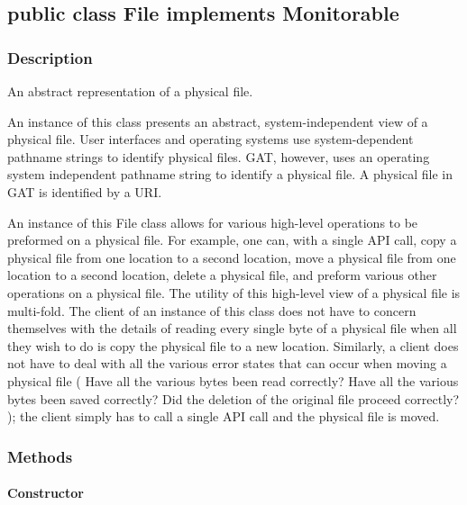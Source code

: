 \documentclass[$Date: 2003/06/26 19:29:31 $]{glabarticle}
\begin{document}
\subsection{public class File implements Monitorable}


\subsubsection{Description}

An abstract representation of a physical file.

An instance of this class presents an abstract, system-independent
view of a physical file. User interfaces and operating systems use
system-dependent pathname strings to identify physical files. GAT,
however, uses an operating system independent pathname string to
identify a physical file. A physical file in GAT is identified by a
URI.

An instance of this File class allows for various high-level
operations to be preformed on a physical file. For example, one can,
with a single API call, copy a physical file from one location to a
second location, move a physical file from one location to a second
location, delete a physical file, and preform various other operations
on a physical file. The utility of this high-level view of a physical
file is multi-fold. The client of an instance of this class does not
have to concern themselves with the details of reading every single
byte of a physical file when all they wish to do is copy the physical
file to a new location. Similarly, a client does not have to deal with
all the various error states that can occur when moving a physical
file ( Have all the various bytes been read correctly? Have all the
various bytes been saved correctly? Did the deletion of the original
file proceed correctly? ); the client simply has to call a single API
call and the physical file is moved.


\subsubsection{Methods}

\paragraph{Constructor}
\end{document}

